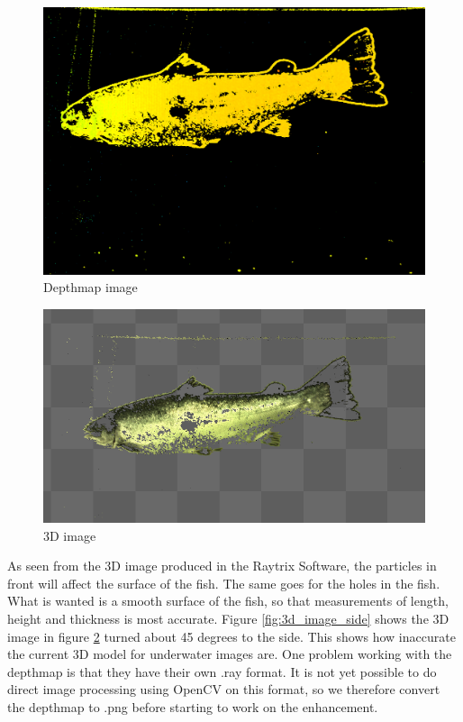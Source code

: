 \begin{figure}[h]
    \centering
    \includegraphics[width=.9\linewidth]{images/introduction/depthmap}
    \caption{Depthmap image}
    \label{fig:depthmap}
\end{figure}

\begin{figure}[h]
    \centering
    \includegraphics[width=.9\linewidth]{images/introduction/depth3D}
    \caption{3D image}
    \label{fig:3d_image}
\end{figure}

As seen from the 3D image produced in the Raytrix Software, the particles in front will affect the surface of the fish. The same goes for the holes in the fish. What is wanted is a smooth surface of the fish, so that measurements of length, height and thickness is most accurate. Figure \ref{fig:3d_image_side} shows the 3D image in figure \ref{fig:3d_image} turned about 45 degrees to the side. This shows how inaccurate the current 3D model for underwater images are. 
One problem working with the depthmap is that they have their own .ray format. It is not yet possible to do direct image processing using OpenCV on this format, so we therefore convert the depthmap to .png before starting to work on the enhancement.

